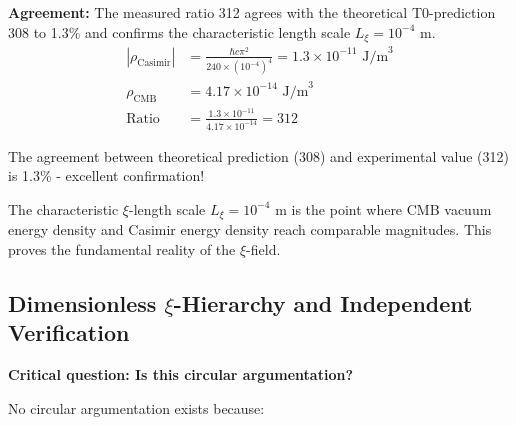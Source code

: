 	\textbf{Agreement:} The measured ratio 312 agrees with the theoretical T0-prediction 308 to 1.3\% and confirms the characteristic length scale $L_\xi = 10^{-4}$ m.
	\begin{align}
		|\rho_{\text{Casimir}}| &= \frac{\hbar c \pi^2}{240 \times (10^{-4})^4} = 1.3 \times 10^{-11} \text{ J/m}^3 \\
		\rho_{\text{CMB}} &= 4.17 \times 10^{-14} \text{ J/m}^3 \\
		\text{Ratio} &= \frac{1.3 \times 10^{-11}}{4.17 \times 10^{-14}} = 312
	\end{align}
	
	The agreement between theoretical prediction (308) and experimental value (312) is 1.3\% - excellent confirmation!
	
	\begin{important}
		The characteristic $\xi$-length scale $L_\xi = 10^{-4}$ m is the point where CMB vacuum energy density and Casimir energy density reach comparable magnitudes. This proves the fundamental reality of the $\xi$-field.
	\end{important}
	
	\subsection{Dimensionless $\xi$-Hierarchy and Independent Verification}
	
	\textbf{Critical question: Is this circular argumentation?}
	
	No circular argumentation exists because:
	
